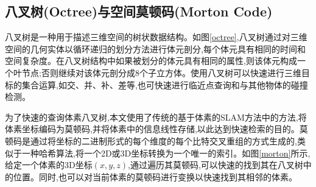 \subsection{八叉树(Octree)与空间莫顿码(Morton Code)}
\begin{figure}[htbp]
    \centering
    \centering
\end{figure}
八叉树是一种用于描述三维空间的树状数据结构。如图\ref{octree},八叉树通过对三维空间的几何实体以循环递归的划分方法进行体元剖分,每个体元具有相同的时间和空间复杂度。在八叉树结构中如果被划分的体元具有相同的属性,则该体元构成一个叶节点;否则继续对该体元剖分成8个子立方体。使用八叉树可以快速进行三维目标的集合运算,如交、并、补、差等,也可快速进行临近点查询和与其他物体的碰撞检测。

为了快速的查询体素八叉树,本文使用了传统的基于体素的SLAM方法\cite{traditionalslam}中的方法,将体素坐标编码为莫顿码,并将体素中的信息线性存储,以此达到快速检索的目的。莫顿码是通过将坐标的二进制形式的每个维度的每个比特交叉重组的方式生成的,类似于一种哈希算法,将一个2D或3D坐标转换为一个唯一的索引。如图\ref{morton}所示,给定一个体素的3D坐标$(x,y,z)$,通过遍历其莫顿码,可以快速的找到其在八叉树中的位置。同时,也可以对当前体素的莫顿码进行变换以快速找到其相邻的体素。
